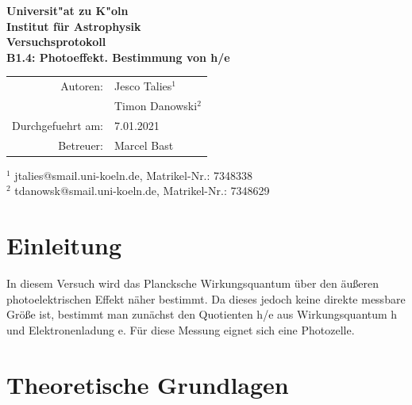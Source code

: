 \documentclass{scrartcl}
\begin{document}
\thispagestyle{empty}
\vspace*{\fill}
\begin{center}
	\Huge
	\textbf{Universit"at zu K"oln}\\
	\LARGE
	\textbf{Institut für Astrophysik}\\
	\vspace{2cm}
	\textbf{Versuchsprotokoll}\\
	\vspace{0.5cm}
	\large
	\textbf{B1.4: Photoeffekt. Bestimmung von h/e}\\
	\normalsize
	\vspace{2cm}
	\begin{tabular}{r l}
		Autoren: 	& Jesco Talies$^1$\\
					& Timon Danowski$^2$\\
		Durchgefuehrt am:	& 7.01.2021\\
		Betreuer:	& Marcel Bast
	\end{tabular}
\end{center}
\vfill\footnotesize
$^1$ jtalies@smail.uni-koeln.de, Matrikel-Nr.: 7348338\\
$^2$ tdanowsk@smail.uni-koeln.de, Matrikel-Nr.: 7348629\\
\normalsize

\newpage
\thispagestyle{empty}
\tableofcontents
\clearpage
\setcounter{page}{1}





\section{Einleitung}
	In diesem Versuch wird das Plancksche Wirkungsquantum über den äußeren photoelektrischen Effekt
	näher bestimmt. Da dieses jedoch keine direkte messbare Größe ist, bestimmt man zunächst
	den Quotienten h/e aus Wirkungsquantum h und Elektronenladung e. Für diese Messung eignet sich
	eine Photozelle. 
\section{Theoretische Grundlagen}
\end{document}

